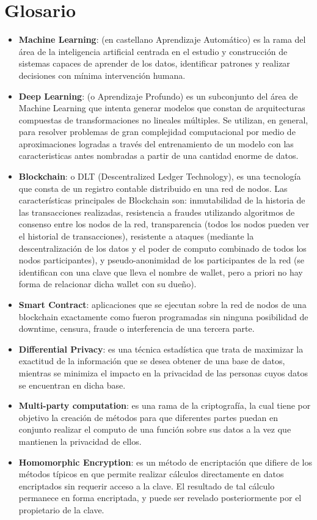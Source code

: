 \documentclass[
11pt, %
oneside, %
spanish, %
singlespacing, %
parskip, %
headsepline, %
chapterinoneline, %
]{MastersDoctoralThesis} %
\begin{document}
\chapter{Glosario}
\begin{itemize}
\item \textbf{Machine Learning}: (en castellano Aprendizaje Automático) es la rama del área de la inteligencia artificial centrada en el estudio y construcción de sistemas capaces de aprender de los datos, identificar patrones y realizar decisiones con mínima intervención humana. 
\item \textbf{Deep Learning}: (o Aprendizaje Profundo) es un subconjunto del área de Machine Learning que intenta generar modelos que constan de arquitecturas compuestas de transformaciones no lineales múltiples. Se utilizan, en general, para resolver problemas de gran complejidad computacional por medio de aproximaciones logradas a través del entrenamiento de un modelo con las caracteristicas antes nombradas a partir de una cantidad enorme de datos.
\item \textbf{Blockchain}: o DLT (Descentralized Ledger Technology), es una tecnología que consta de un registro contable distribuido en una red de nodos. Las características principales de Blockchain son: inmutabilidad de la historia de las transacciones realizadas, resistencia a fraudes utilizando algoritmos de consenso entre los nodos de la red, transparencia (todos los nodos pueden ver el historial de transacciones), resistente a ataques (mediante la descentralización de los datos y el poder de computo combinado de todos los nodos participantes), y pseudo-anonimidad de los participantes de la red (se identifican con una clave que lleva el nombre de wallet, pero a  priori no hay forma de relacionar dicha wallet con su dueño).
\item \textbf{Smart Contract}: aplicaciones que se ejecutan sobre la red de nodos de una blockchain exactamente como fueron programadas sin ninguna posibilidad de downtime, censura, fraude o interferencia de una tercera parte.
\item \textbf{Differential Privacy}: es una técnica estadística que trata de maximizar la exactitud de la información que se desea obtener de una base de datos, mientras se minimiza el impacto  en la privacidad de las personas cuyos datos se encuentran en dicha base.
\item \textbf{Multi-party computation}: es una rama de la criptografía, la cual tiene por objetivo la creación de métodos para que diferentes partes puedan en conjunto realizar el computo de una función sobre sus datos a la vez que mantienen la privacidad de ellos.
\item \textbf{Homomorphic Encryption}: es un método de encriptación que difiere de los métodos típicos en que permite realizar cálculos directamente en datos encriptados sin requerir acceso a la clave. El resultado de tal cálculo permanece en forma encriptada, y puede ser revelado posteriormente por el propietario de la clave.
\end{itemize}


\end{document}
